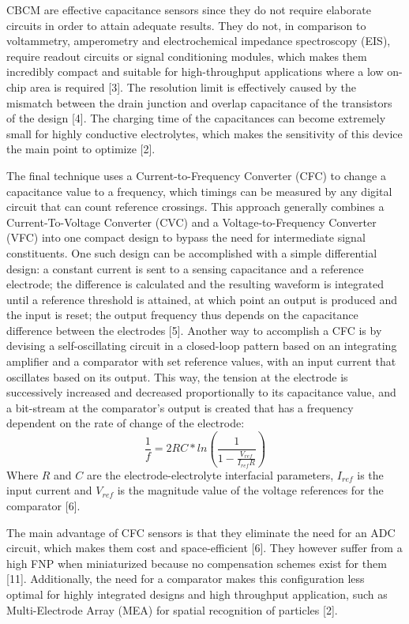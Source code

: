 CBCM are effective capacitance sensors since they do not require elaborate circuits in order to attain adequate results. They do not, in comparison to voltammetry, amperometry and electrochemical impedance spectroscopy (EIS), require readout circuits or signal conditioning modules, which makes them incredibly compact and suitable for high-throughput applications where a low on-chip area is required [3]. The resolution limit is effectively caused by the mismatch between the drain junction and overlap capacitance of the transistors of the design [4]. The charging time of the capacitances can become extremely small for highly conductive electrolytes, which makes the sensitivity of this device the main point to optimize [2]. \par

The final technique uses a Current-to-Frequency Converter (CFC) to change a capacitance value to a frequency, which timings can be measured by any digital circuit that can count reference crossings. This approach generally combines a Current-To-Voltage Converter (CVC) and a Voltage-to-Frequency Converter (VFC) into one compact design to bypass the need for intermediate signal constituents. One such design can be accomplished with a simple differential design: a constant current is sent to a sensing capacitance and a reference electrode; the difference is calculated and the resulting waveform is integrated until a reference threshold is attained, at which point an output is produced and the input is reset; the output frequency thus depends on the capacitance difference between the electrodes [5]. Another way to accomplish a CFC is by devising a self-oscillating circuit in a closed-loop pattern based on an integrating amplifier and a comparator with set reference values, with an input current that oscillates based on its output. This way, the tension at the electrode is successively increased and decreased proportionally to its capacitance value, and a bit-stream at the comparator’s output is created that has a frequency dependent on the rate of change of the electrode:
\begin{equation}
   \frac{1}{f} = 2 R C * ln(\frac{1}{1-\frac{V_{ref}}{I_{ref} R}})
\end{equation}
Where $R$ and $C$ are the electrode-electrolyte interfacial parameters, $I_{ref}$ is the input current and $V_{ref}$ is the magnitude value of the voltage references for the comparator [6]. \par

The main advantage of CFC sensors is that they eliminate the need for an ADC circuit, which makes them cost and space-efficient [6]. They however suffer from a high FNP when miniaturized because no compensation schemes exist for them [11]. Additionally, the need for a comparator makes this configuration less optimal for highly integrated designs and high throughput application, such as Multi-Electrode Array (MEA) for spatial recognition of particles [2].\par

